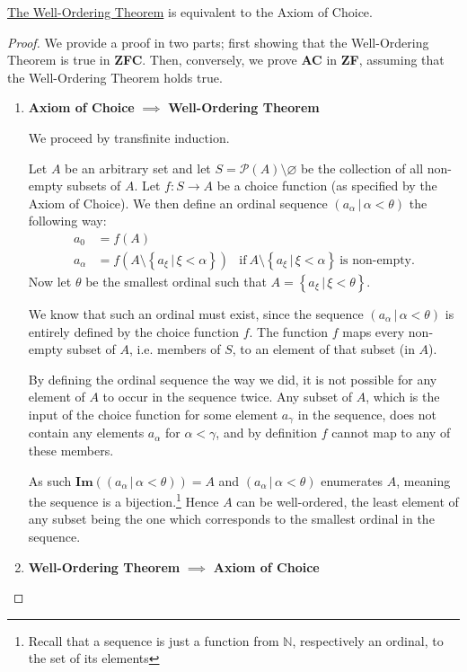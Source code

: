 \documentclass[../../main.tex]{subfiles}
\begin{document}
\begin{theorem}\label{well-order-thm-equivalence}\cite[Theorem 15]{Jec78}
    \hyperref[well-order-thm]{The Well-Ordering Theorem} is equivalent to the Axiom of Choice. %
\end{theorem}

\begin{proof}
    We provide a proof in two parts; first showing that the Well-Ordering Theorem is true in \textbf{ZFC}.
    Then, conversely, we prove \textbf{AC} in \textbf{ZF}, assuming that the Well-Ordering Theorem holds true.
    \begin{enumerate}
        \item \textbf{Axiom of Choice} $\implies$ \textbf{Well-Ordering Theorem}
        
        We proceed by transfinite induction.

        Let $A$ be an arbitrary set and let $S = \mathcal{P}(A) \setminus \varnothing$ be the collection of all non-empty subsets of $A$.
        Let $f: S \to A$ be a choice function (as specified by the Axiom of Choice).
        We then define an ordinal sequence $\left(a_{\alpha} \, \vert \, \alpha < \theta \right)$ the following way:
        \begin{align*}
            a_0 &= f(A)\\
            a_{\alpha} &= f\left(A \setminus \left\{a_\xi \, \vert \, \xi < \alpha\right\} \right)
            &\text{if}\ A \setminus \left\{a_\xi \, \vert \, \xi < \alpha\right\}\ \text{is non-empty}.
        \end{align*}
        Now let $\theta$ be the smallest ordinal such that $A = \left\{a_\xi \, \vert \, \xi < \theta\right\}$.
        
        We know that such an ordinal must exist, since the sequence $\left(a_{\alpha} \, \vert \, \alpha < \theta \right)$ is entirely defined by the choice function $f$.
        The function $f$ maps every non-empty subset of $A$, i.e. members of $S$, to an element of that subset (in $A$).
        
        By defining the ordinal sequence the way we did, it is not possible for any element of $A$ to occur in the sequence twice.
        Any subset of $A$, which is the input of the choice function for some element $a_\gamma$ in the sequence, does not contain any elements $a_\alpha$ for $\alpha < \gamma$, and by definition $f$ cannot map to any of these members.
        
        As such $\mathbf{Im}\left(\left(a_{\alpha} \, \vert \, \alpha < \theta \right)\right) = A$
        and $\left(a_{\alpha} \, \vert \, \alpha < \theta \right)$ enumerates $A$, meaning the sequence is a bijection.\footnote{Recall that a sequence is just a function from $\mathbb{N}$, respectively an ordinal, to the set of its elements}
        Hence $A$ can be well-ordered, the least element of any subset being the one which corresponds to the smallest ordinal in the sequence.
        \item \textbf{Well-Ordering Theorem} $\implies$ \textbf{Axiom of Choice}
        

\end{enumerate}
\end{proof}
\end{document}
